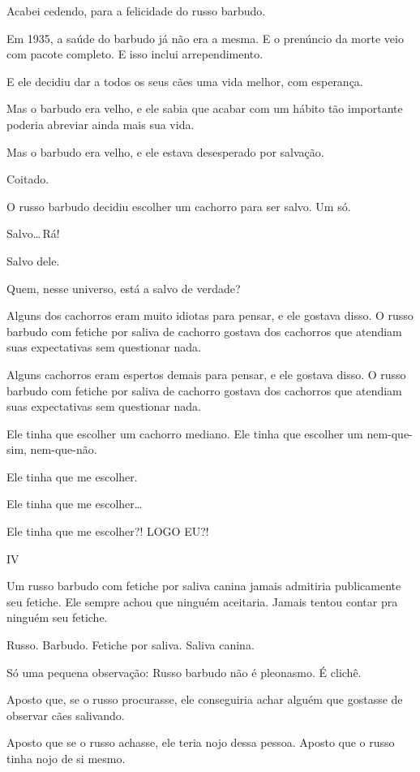 Acabei cedendo, para a felicidade do russo barbudo.

Em 1935, a saúde do barbudo já não era a mesma. E o prenúncio da morte veio com pacote completo. E isso inclui arrependimento.

E ele decidiu dar a todos os seus cães uma vida melhor, com esperança.

Mas o barbudo era velho, e ele sabia que acabar com um hábito tão importante poderia abreviar ainda mais sua vida.

Mas o barbudo era velho, e ele estava desesperado por salvação.

Coitado.

O russo barbudo decidiu escolher um cachorro para ser salvo. Um só.

Salvo\ldots\,Rá!

Salvo dele.

Quem, nesse universo, está a salvo de verdade?

Alguns dos cachorros eram muito idiotas para pensar, e ele gostava disso. O russo barbudo com fetiche por saliva de cachorro gostava dos cachorros que atendiam suas expectativas sem questionar nada.

Alguns cachorros eram espertos demais para pensar, e ele gostava disso. O russo barbudo com fetiche por saliva de cachorro gostava dos cachorros que atendiam suas expectativas sem questionar nada.

Ele tinha que escolher um cachorro mediano. Ele tinha que escolher um nem-que-sim, nem-que-não.

Ele tinha que me escolher.

Ele tinha que me escolher\ldots

Ele tinha que me escolher?! LOGO EU?!

\begin{center}
{\Large IV}
\end{center}

Um russo barbudo com fetiche por saliva canina jamais admitiria publicamente seu fetiche. Ele sempre achou que ninguém aceitaria. Jamais tentou contar pra ninguém seu fetiche.

Russo. Barbudo. Fetiche por saliva. Saliva canina.

Só uma pequena observação: Russo barbudo não é pleonasmo. É clichê.

Aposto que, se o russo procurasse, ele conseguiria achar alguém que gostasse de observar cães salivando.

Aposto que se o russo achasse, ele teria nojo dessa pessoa. Aposto que o russo tinha nojo de si mesmo.

